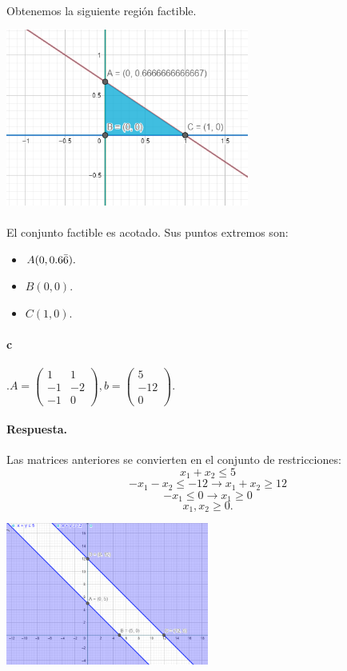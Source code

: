 \documentclass{article}
\begin{document}
	\paragraph{}Obtenemos la siguiente región factible.
	\begin{center}
		\includegraphics[width=0.6\textwidth]{3-b}
	\end{center}
	\paragraph{} El conjunto factible es acotado. Sus puntos extremos son:
	\begin{itemize}
		\item $A(0,0.6\Bar{6}).$
		\item $B(0,0).$
		\item $C(1,0).$
	\end{itemize}
	\paragraph{c}.$
	A = \begin{pmatrix}
	1 & 1\\
	-1 & -2\\
	-1 & 0
	\end{pmatrix},
	b = \begin{pmatrix}
	5\\
	-12\\
	0
	\end{pmatrix}
	$.
	\paragraph{Respuesta.} Las matrices anteriores se convierten en el conjunto de restricciones:
	$$x_1 + x_2 \leq 5$$
	$$-x_1 - x_2 \leq -12 \xrightarrow{} x_1 + x_2 \geq 12$$
	$$-x_1 \leq 0 \xrightarrow{} x_1 \geq 0$$
	$$x_1, x_2 \geq 0.$$
	\begin{center}
		\includegraphics[width=0.5\textwidth]{3-c}
	\end{center}
\end{document}
